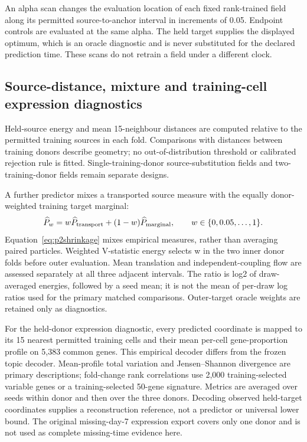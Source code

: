 An alpha scan changes the evaluation location of each fixed rank-trained field along its permitted source-to-anchor interval in increments of 0.05. Endpoint controls are evaluated at the same alpha. The held target supplies the displayed optimum, which is an oracle diagnostic and is never substituted for the declared prediction time. These scans do not retrain a field under a different clock.

\subsection{Source-distance, mixture and training-cell expression diagnostics}
Held-source energy and mean 15-neighbour distances are computed relative to the permitted training sources in each fold. Comparisons with distances between training donors describe geometry; no out-of-distribution threshold or calibrated rejection rule is fitted. Single-training-donor source-substitution fields and two-training-donor fields remain separate designs.

A further predictor mixes a transported source measure with the equally donor-weighted training target marginal:
\begin{equation}
\widehat P_w=w\widehat P_{\rm transport}+(1-w)\widehat P_{\rm marginal},\qquad w\in\{0,0.05,\ldots,1\}.\label{eq:p2shrinkage}
\end{equation}
Equation~\eqref{eq:p2shrinkage} mixes empirical measures, rather than averaging paired particles. Weighted V-statistic energy selects w in the two inner donor folds before outer evaluation. Mean translation and independent-coupling flow are assessed separately at all three adjacent intervals. The ratio is log2 of draw-averaged energies, followed by a seed mean; it is not the mean of per-draw log ratios used for the primary matched comparisons. Outer-target oracle weights are retained only as diagnostics.

For the held-donor expression diagnostic, every predicted coordinate is mapped to its 15 nearest permitted training cells and their mean per-cell gene-proportion profile on 5,383 common genes. This empirical decoder differs from the frozen topic decoder. Mean-profile total variation and Jensen--Shannon divergence are primary descriptions; fold-change rank correlations use 2,000 training-selected variable genes or a training-selected 50-gene signature. Metrics are averaged over seeds within donor and then over the three donors. Decoding observed held-target coordinates supplies a reconstruction reference, not a predictor or universal lower bound. The original missing-day-7 expression export covers only one donor and is not used as complete missing-time evidence here.

